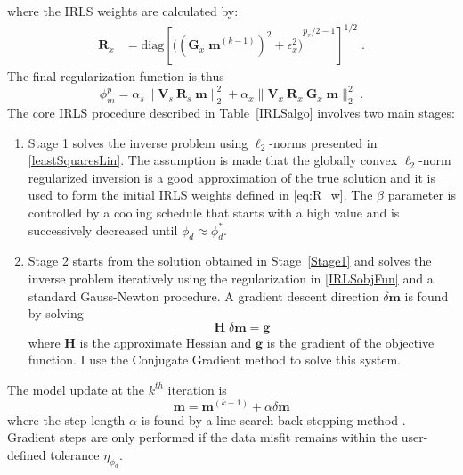 where the IRLS weights are calculated by:
\begin{equation}\label{eq:Rx_w}
\begin{split}
	\mathbf{R}_x &= \text{diag} \left[{\Big( ({{\mathbf{ G}_x\;\mathbf{m}}^{(k-1)}})^{2} + \epsilon_x^2 \Big)}^{p_x/2 - 1} \right]^{1/2} \;.
\end{split}
\end{equation}
The final regularization function is thus
\begin{equation}\label{IRLSobjFun}
\phi_m^p =\alpha_s \| \mathbf{V}_s\:\mathbf{R}_s\;\mathbf{m}\|_2^2 + \alpha_x\|\mathbf{V}_x\:\mathbf{R}_x\:\mathbf{G}_x\;\mathbf{m}\|_2^2 \;.
\end{equation}
The core IRLS procedure described in Table~\ref{IRLSalgo} involves two main stages:
\begin{enumerate}
\item \label{Stage1} Stage 1 solves the inverse problem using $\ell_2$-norms presented in \eqref{leastSquaresLin}. The assumption is made that the globally convex $\ell_2$-norm regularized inversion is a good approximation of the true solution and it is used to form the initial IRLS weights defined in \eqref{eq:R_w}. The $\beta$ parameter is controlled by a cooling schedule that starts with a high value and is successively decreased until $\phi_d \approx \phi_d^*$.

\item \label{Stage2} Stage 2 starts from the solution obtained in Stage~\ref{Stage1} and solves the inverse problem iteratively using the regularization in \eqref{IRLSobjFun} and a standard Gauss-Newton procedure. A gradient descent direction $\delta \mathbf{m}$ is found by solving
\begin{equation}\label{GaussNewtStep}
\mathbf{H}\; \delta \mathbf{m} = \mathbf{g}
\end{equation}
where $\mathbf{H}$ is the approximate Hessian and $\mathbf{g}$ is the gradient of the objective function. I use the Conjugate Gradient method \cite[]{HestenesStiefel1952} to solve this system.
\end{enumerate}
The model update at the $k^{th}$ iteration is
\begin{equation}\label{GNmodelUpdate}
\mathbf{m} = \mathbf{m}^{(k-1)} + \alpha \delta \mathbf{m}
\end{equation}
where the step length $\alpha$ is found by a line-search back-stepping method \cite[]{NocedalWright99}.
Gradient steps are only performed if the data misfit remains within the user-defined tolerance $\eta_{\phi_d}$.
